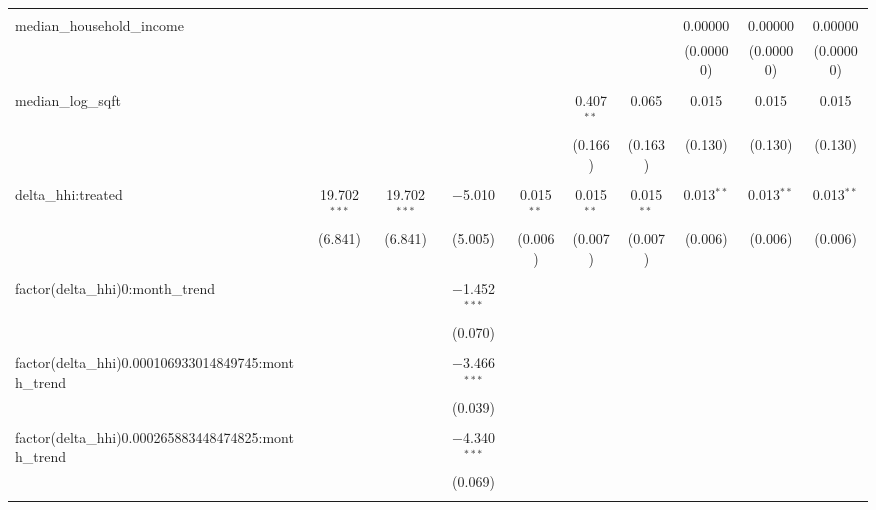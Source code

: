 \begin{table}[H]
{\begin{tabular}{@{\extracolsep{5pt}}lccccccccc}
   & & & & & & & & & \\  

  median\_household\_income &  &  &  &  &  &  & 0.00000 & 0.00000 & 0.00000 \\  

   &  &  &  &  &  &  & (0.00000) & (0.00000) & (0.00000) \\  

   & & & & & & & & & \\  

  median\_log\_sqft &  &  &  &  & 0.407$^{**}$ & 0.065 & 0.015 & 0.015 & 0.015 \\  

   &  &  &  &  & (0.166) & (0.163) & (0.130) & (0.130) & (0.130) \\  

   & & & & & & & & & \\  

  delta\_hhi:treated & 19.702$^{***}$ & 19.702$^{***}$ & $-$5.010 & 0.015$^{**}$ & 0.015$^{**}$ & 0.015$^{**}$ & 0.013$^{**}$ & 0.013$^{**}$ & 0.013$^{**}$ \\  

   & (6.841) & (6.841) & (5.005) & (0.006) & (0.007) & (0.007) & (0.006) & (0.006) & (0.006) \\  

   & & & & & & & & & \\  

  factor(delta\_hhi)0:month\_trend &  &  & $-$1.452$^{***}$ &  &  &  &  &  &  \\  

   &  &  & (0.070) &  &  &  &  &  &  \\  

   & & & & & & & & & \\  

  factor(delta\_hhi)0.000106933014849745:month\_trend &  &  & $-$3.466$^{***}$ &  &  &  &  &  &  \\  

   &  &  & (0.039) &  &  &  &  &  &  \\  

   & & & & & & & & & \\  

  factor(delta\_hhi)0.000265883448474825:month\_trend &  &  & $-$4.340$^{***}$ &  &  &  &  &  &  \\  

   &  &  & (0.069) &  &  &  &  &  &  \\  

   & & & & & & & & & \\  


\end{tabular}}
\end{table}
